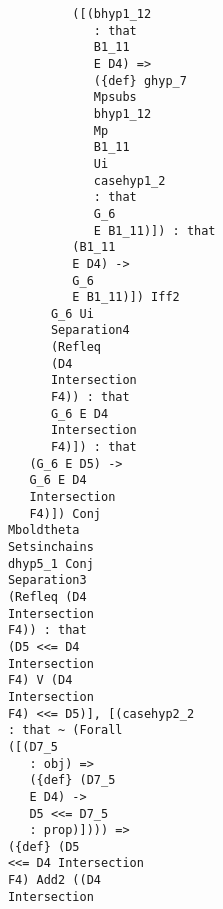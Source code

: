 \documentclass[12pt]{article}
\begin{document}
\begin{verbatim}
                                        ([(bhyp1_12 
                                           : that 
                                           B1_11 
                                           E D4) => 
                                           ({def} ghyp_7 
                                           Mpsubs 
                                           bhyp1_12 
                                           Mp 
                                           B1_11 
                                           Ui 
                                           casehyp1_2 
                                           : that 
                                           G_6 
                                           E B1_11)]) : that 
                                        (B1_11 
                                        E D4) -> 
                                        G_6 
                                        E B1_11)]) Iff2 
                                     G_6 Ui 
                                     Separation4 
                                     (Refleq 
                                     (D4 
                                     Intersection 
                                     F4)) : that 
                                     G_6 E D4 
                                     Intersection 
                                     F4)]) : that 
                                  (G_6 E D5) -> 
                                  G_6 E D4 
                                  Intersection 
                                  F4)]) Conj 
                               Mboldtheta 
                               Setsinchains 
                               dhyp5_1 Conj 
                               Separation3 
                               (Refleq (D4 
                               Intersection 
                               F4)) : that 
                               (D5 <<= D4 
                               Intersection 
                               F4) V (D4 
                               Intersection 
                               F4) <<= D5)], [(casehyp2_2 
                               : that ~ (Forall 
                               ([(D7_5 
                                  : obj) => 
                                  ({def} (D7_5 
                                  E D4) -> 
                                  D5 <<= D7_5 
                                  : prop)]))) => 
                               ({def} (D5 
                               <<= D4 Intersection 
                               F4) Add2 ((D4 
                               Intersection 

\end{verbatim}
\end{document}
